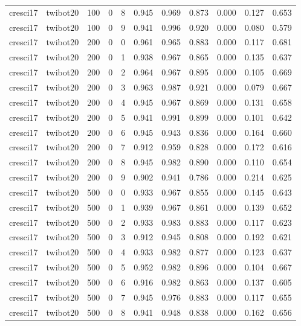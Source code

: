 \begin{tabular}{llrrrrrrrrr}
cresci17 & twibot20 & 100 & 0 & 8 & 0.945 & 0.969 & 0.873 & 0.000 & 0.127 & 0.653 \\
cresci17 & twibot20 & 100 & 0 & 9 & 0.941 & 0.996 & 0.920 & 0.000 & 0.080 & 0.579 \\
cresci17 & twibot20 & 200 & 0 & 0 & 0.961 & 0.965 & 0.883 & 0.000 & 0.117 & 0.681 \\
cresci17 & twibot20 & 200 & 0 & 1 & 0.938 & 0.967 & 0.865 & 0.000 & 0.135 & 0.637 \\
cresci17 & twibot20 & 200 & 0 & 2 & 0.964 & 0.967 & 0.895 & 0.000 & 0.105 & 0.669 \\
cresci17 & twibot20 & 200 & 0 & 3 & 0.963 & 0.987 & 0.921 & 0.000 & 0.079 & 0.667 \\
cresci17 & twibot20 & 200 & 0 & 4 & 0.945 & 0.967 & 0.869 & 0.000 & 0.131 & 0.658 \\
cresci17 & twibot20 & 200 & 0 & 5 & 0.941 & 0.991 & 0.899 & 0.000 & 0.101 & 0.642 \\
cresci17 & twibot20 & 200 & 0 & 6 & 0.945 & 0.943 & 0.836 & 0.000 & 0.164 & 0.660 \\
cresci17 & twibot20 & 200 & 0 & 7 & 0.912 & 0.959 & 0.828 & 0.000 & 0.172 & 0.616 \\
cresci17 & twibot20 & 200 & 0 & 8 & 0.945 & 0.982 & 0.890 & 0.000 & 0.110 & 0.654 \\
cresci17 & twibot20 & 200 & 0 & 9 & 0.902 & 0.941 & 0.786 & 0.000 & 0.214 & 0.625 \\
cresci17 & twibot20 & 500 & 0 & 0 & 0.933 & 0.967 & 0.855 & 0.000 & 0.145 & 0.643 \\
cresci17 & twibot20 & 500 & 0 & 1 & 0.939 & 0.967 & 0.861 & 0.000 & 0.139 & 0.652 \\
cresci17 & twibot20 & 500 & 0 & 2 & 0.933 & 0.983 & 0.883 & 0.000 & 0.117 & 0.623 \\
cresci17 & twibot20 & 500 & 0 & 3 & 0.912 & 0.945 & 0.808 & 0.000 & 0.192 & 0.621 \\
cresci17 & twibot20 & 500 & 0 & 4 & 0.933 & 0.982 & 0.877 & 0.000 & 0.123 & 0.637 \\
cresci17 & twibot20 & 500 & 0 & 5 & 0.952 & 0.982 & 0.896 & 0.000 & 0.104 & 0.667 \\
cresci17 & twibot20 & 500 & 0 & 6 & 0.916 & 0.982 & 0.863 & 0.000 & 0.137 & 0.605 \\
cresci17 & twibot20 & 500 & 0 & 7 & 0.945 & 0.976 & 0.883 & 0.000 & 0.117 & 0.655 \\
cresci17 & twibot20 & 500 & 0 & 8 & 0.941 & 0.948 & 0.838 & 0.000 & 0.162 & 0.656 \\

\end{tabular}
